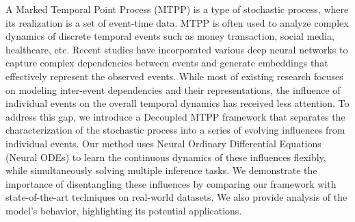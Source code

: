 A Marked Temporal Point Process (MTPP) is a type of stochastic process, where its realization is a set of event-time data. 
MTPP is often used to analyze complex dynamics of discrete temporal events such as money transaction, social media, healthcare, etc. 
Recent studies have incorporated various deep neural networks to capture complex dependencies between events and generate embeddings that effectively represent the observed events. 
While most of existing research focuses on modeling inter-event dependencies and their representations, the influence of individual events on the overall temporal dynamics has received less attention.
To address this gap, we introduce a Decoupled MTPP framework that separates the characterization of the stochastic process into a series of 
evolving influences from individual events. 
Our method uses Neural Ordinary Differential Equations (Neural ODEs) to learn the continuous dynamics of these influences flexibly, 
while simultaneously solving multiple inference tasks.
We demonstrate the importance of disentangling these influences by comparing our framework with state-of-the-art techniques on real-world datasets.
We also provide analysis of the model's behavior, highlighting its potential applications.
